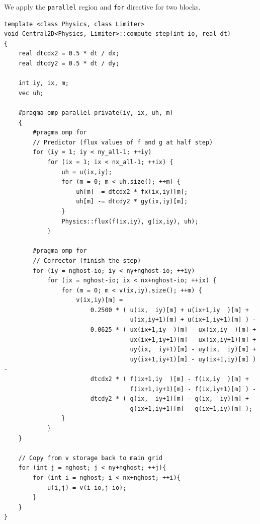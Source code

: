 \documentclass[12pt]{article}
\numberwithin{equation}{section}
\begin{document}
We apply the \texttt{parallel} region and \texttt{for} directive for two blocks.
\begin{verbatim}
template <class Physics, class Limiter>
void Central2D<Physics, Limiter>::compute_step(int io, real dt)
{
    real dtcdx2 = 0.5 * dt / dx;
    real dtcdy2 = 0.5 * dt / dy;

    int iy, ix, m;
    vec uh;

    #pragma omp parallel private(iy, ix, uh, m)
    {
        #pragma omp for
        // Predictor (flux values of f and g at half step)
        for (iy = 1; iy < ny_all-1; ++iy)
            for (ix = 1; ix < nx_all-1; ++ix) {
                uh = u(ix,iy);
                for (m = 0; m < uh.size(); ++m) {
                    uh[m] -= dtcdx2 * fx(ix,iy)[m];
                    uh[m] -= dtcdy2 * gy(ix,iy)[m];
                }
                Physics::flux(f(ix,iy), g(ix,iy), uh);
            }

        #pragma omp for
        // Corrector (finish the step)
        for (iy = nghost-io; iy < ny+nghost-io; ++iy)
            for (ix = nghost-io; ix < nx+nghost-io; ++ix) {
                for (m = 0; m < v(ix,iy).size(); ++m) {
                    v(ix,iy)[m] =
                        0.2500 * ( u(ix,  iy)[m] + u(ix+1,iy  )[m] +
                                   u(ix,iy+1)[m] + u(ix+1,iy+1)[m] ) -
                        0.0625 * ( ux(ix+1,iy  )[m] - ux(ix,iy  )[m] +
                                   ux(ix+1,iy+1)[m] - ux(ix,iy+1)[m] +
                                   uy(ix,  iy+1)[m] - uy(ix,  iy)[m] +
                                   uy(ix+1,iy+1)[m] - uy(ix+1,iy)[m] ) -
                        dtcdx2 * ( f(ix+1,iy  )[m] - f(ix,iy  )[m] +
                                   f(ix+1,iy+1)[m] - f(ix,iy+1)[m] ) -
                        dtcdy2 * ( g(ix,  iy+1)[m] - g(ix,  iy)[m] +
                                   g(ix+1,iy+1)[m] - g(ix+1,iy)[m] );
                }
            }
    }

    // Copy from v storage back to main grid
    for (int j = nghost; j < ny+nghost; ++j){
        for (int i = nghost; i < nx+nghost; ++i){
            u(i,j) = v(i-io,j-io);
        }
    }
}
\end{verbatim}
\end{document}
